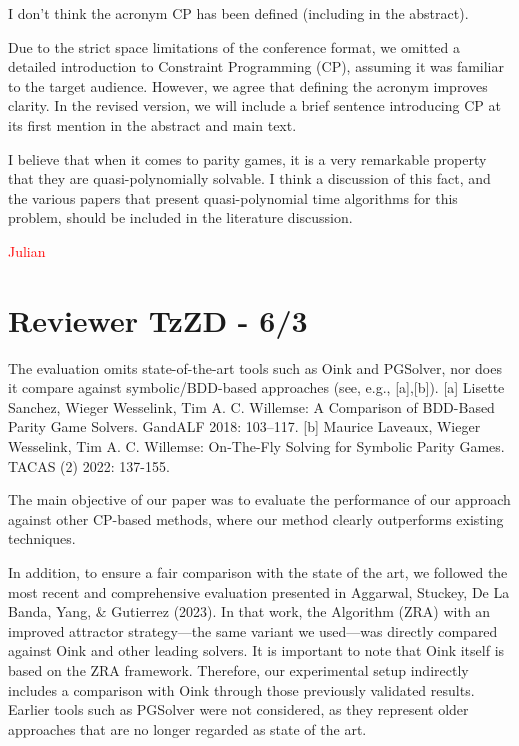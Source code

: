 \documentclass{article}
\begin{document}
\begin{reviewer}
I don't think the acronym CP has been defined (including in the abstract).
\end{reviewer}

Due to the strict space limitations of the conference format, we omitted a detailed introduction to Constraint Programming (CP), assuming it was familiar to the target audience. However, we agree that defining the acronym improves clarity. In the revised version, we will include a brief sentence introducing CP at its first mention in the abstract and main text.

\begin{reviewer}
I believe that when it comes to parity games, it is a very remarkable property that they are quasi-polynomially solvable. I think a discussion of this fact, and the various papers that present quasi-polynomial time algorithms for this problem, should be included in the literature discussion.
\end{reviewer}

\textcolor{red}{Julian}


\section{Reviewer TzZD - 6/3}\label{rev:TzZD}

\begin{reviewer}
The evaluation omits state-of-the-art tools such as Oink and PGSolver, nor does it compare against symbolic/BDD-based approaches (see, e.g., [a],[b]).
[a] Lisette Sanchez, Wieger Wesselink, Tim A. C. Willemse: A Comparison of BDD-Based Parity Game Solvers. GandALF 2018: 103–117.
[b] Maurice Laveaux, Wieger Wesselink, Tim A. C. Willemse: On-The-Fly Solving for Symbolic Parity Games. TACAS (2) 2022: 137-155.
\end{reviewer}

The main objective of our paper was to evaluate the performance of our approach against other CP-based methods, where our method clearly outperforms existing techniques.

In addition, to ensure a fair comparison with the state of the art, we followed the most recent and comprehensive evaluation presented in Aggarwal, Stuckey, De La Banda, Yang, \& Gutierrez (2023). In that work, the Algorithm (ZRA) with an improved attractor strategy—the same variant we used—was directly compared against Oink and other leading solvers. It is important to note that Oink itself is based on the ZRA framework. Therefore, our experimental setup indirectly includes a comparison with Oink through those previously validated results. Earlier tools such as PGSolver were not considered, as they represent older approaches that are no longer regarded as state of the art.
\end{document}
